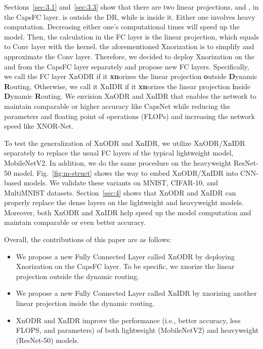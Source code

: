 \documentclass[sn-mathphys,iicol,Numbered]{sn-jnl}
\begin{document}
Sections~\ref{sec:3.1} and~\ref{sec:3.3} show that there are two linear projections,  and , in the CapsFC layer.  is outside the DR, while  is inside it. Either one involves heavy computation. Decreasing either one's computational times will speed up the model. Then, the calculation in the FC layer is the linear projection, which equals to Conv layer with the  kernel. the aforementioned Xnorization is to simplify and approximate the Conv layer. Therefore, we decided to deploy Xnorization on the  and  from the CapsFC layer separately and propose new FC layers. Specifically, we call the FC layer XnODR if it \textbf{xn}orizes the linear projection \textbf{o}utside \textbf{D}ynamic \textbf{R}outing. Otherwise, we call it XnIDR if it \textbf{xn}orizes the linear projection \textbf{i}nside \textbf{D}ynamic \textbf{R}outing. We envision XnODR and XnIDR that enables the network to maintain comparable or higher accuracy like CapsNet while reducing the parameters and floating point of operations (FLOPs) and increasing the network speed like XNOR-Net.

To test the generalization of XnODR and XnIDR, we utilize XnODR/XnIDR separately to replace the usual FC layers of the typical lightweight model, MobileNetV2. In addition, we do the same procedure on the heavyweight ResNet-50 model. Fig.~\ref{fig:m-struct} shows the way to embed XnODR/XnIDR into CNN-based models. We validate these variants on MNIST, CIFAR-10, and MultiMNIST datasets. Section~\ref{sec:4} shows that XnODR and XnIDR can properly replace the dense layers on the lightweight and heavyweight models. Moreover, both XnODR and XnIDR help speed up the model computation and maintain comparable or even better accuracy.

Overall, the contributions of this paper are as follows:

\begin{itemize}
\item We propose a new Fully Connected Layer called XnODR by deploying Xnorization on the CapsFC layer. To be specific, we xnorize the linear projection outside the dynamic routing.
\item We propose a new Fully Connected Layer called XnIDR by xnorizing another linear projection inside the dynamic routing.
\item XnODR and XnIDR improve the performance (i.e., better accuracy, less FLOPS, and parameters) of both lightweight (MobileNetV2) and heavyweight (ResNet-50) models.
\end{itemize}
\end{document}
